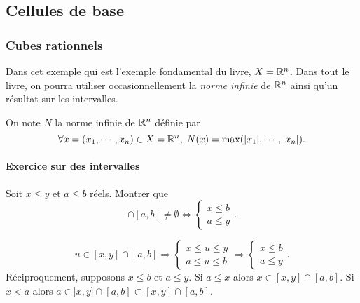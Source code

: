 \subsection{Cellules de base}

\subsubsection{Cubes rationnels}
Dans cet exemple qui est l'exemple fondamental du livre, $X=\mathbb{R}^n$. Dans tout le livre, on pourra utiliser occasionnellement la \emph{norme infinie} de $\mathbb{R}^n$ ainsi qu'un résultat sur les intervalles. 
\begin{defi}
 On note $N$ la norme infinie de $\mathbb{R}^n$ définie par
 \begin{displaymath}
  \forall x=(x_1,\cdots,x_n)\in X= \mathbb{R}^n, \; N(x)=\max(|x_1|,\cdots,|x_n|).
 \end{displaymath}
\end{defi}

 \paragraph{Exercice sur des intervalles} \label{ExoIntervalles}
 Soit $x\leq y$ et $a\leq b$ réels. Montrer que
 \begin{displaymath}
  [x,y] \cap [a,b] \neq \emptyset \Leftrightarrow
  \left\lbrace
  \begin{aligned}
    x \leq b \\
    a \leq y
  \end{aligned}
  \right. .
 \end{displaymath}
\begin{demo}
\begin{displaymath}
 u \in [x,y] \cap [a,b] \Rightarrow
 \left\lbrace
 \begin{aligned}
   x \leq u \leq y \\
   a \leq u \leq b
 \end{aligned}
 \right.
 \Rightarrow
\left\lbrace
 \begin{aligned}
   x \leq b  \\
   a \leq y
 \end{aligned}
 \right. .
 \end{displaymath}
 Réciproquement, supposons $x\leq b$ et $a \leq y$.\newline
 Si $a\leq x$ alors $x \in [x,y]\cap[a,b]$.\newline
 Si $x<a$ alors $a \in ]x,y]\cap [a,b] \subset [x,y]\cap[a,b]$.
\end{demo}

